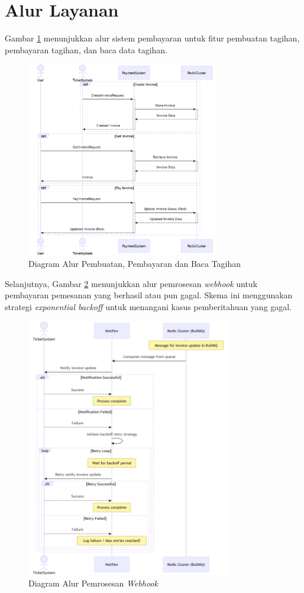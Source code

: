 \section{Alur Layanan}

Gambar \ref{fig:payment-flow1} menunjukkan alur sistem pembayaran untuk fitur pembuatan tagihan, pembayaran tagihan, dan baca data tagihan.

\begin{figure}[H]
    \centering
    \includegraphics[width=0.75\textwidth]{resources/chapter-3/payment-flow1.png}
    \caption{Diagram Alur Pembuatan, Pembayaran dan Baca Tagihan}
    \label{fig:payment-flow1}
\end{figure}

\pagebreak

Selanjutnya, Gambar \ref{fig:payment-flow2} menunjukkan alur pemrosesan \textit{webhook} untuk pembayaran pemesanan yang berhasil atau pun gagal. Skema ini menggunakan strategi \textit{exponential backoff} untuk menangani kasus pemberitahuan yang gagal.

\begin{figure}[H]
    \centering
    \includegraphics[width=0.8\textwidth]{resources/chapter-3/payment-flow2.png}
    \caption{Diagram Alur Pemrosesan \textit{Webhook}}
    \label{fig:payment-flow2}
\end{figure}